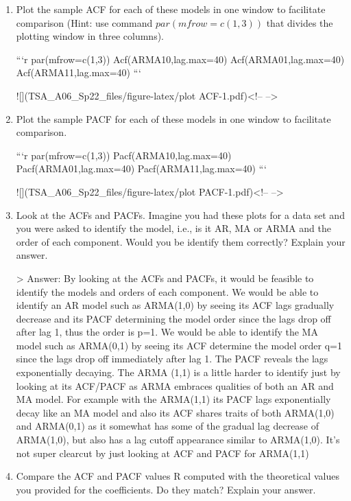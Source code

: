 \documentclass[
]{article}
\begin{document}
\begin{enumerate}[label=(\alph*)]

\item Plot the sample ACF for each of these models in one window to facilitate comparison (Hint: use command $par(mfrow=c(1,3))$ that divides the plotting window in three columns).  


```r
par(mfrow=c(1,3))
Acf(ARMA10,lag.max=40)
Acf(ARMA01,lag.max=40)
Acf(ARMA11,lag.max=40)
```

![](TSA_A06_Sp22_files/figure-latex/plot ACF-1.pdf)<!-- --> 


\item Plot the sample PACF for each of these models in one window to facilitate comparison.  


```r
par(mfrow=c(1,3))
Pacf(ARMA10,lag.max=40)
Pacf(ARMA01,lag.max=40)
Pacf(ARMA11,lag.max=40)
```

![](TSA_A06_Sp22_files/figure-latex/plot PACF-1.pdf)<!-- --> 

\item Look at the ACFs and PACFs. Imagine you had these plots for a data set and you were asked to identify the model, i.e., is it AR, MA or ARMA and the order of each component. Would you be identify them correctly? Explain your answer.

> Answer: By looking at the ACFs and PACFs, it would be feasible to identify the models and orders of each component. We would be able to identify an AR model such as ARMA(1,0) by seeing its ACF lags gradually decrease and its PACF determining the model order since the lags drop off after lag 1, thus the order is p=1. We would be able to identify the MA model such as ARMA(0,1) by seeing its ACF determine the model order q=1 since the lags drop off immediately after lag 1. The PACF reveals the lags exponentially decaying. The ARMA (1,1) is a little harder to identify just by looking at its ACF/PACF as ARMA embraces qualities of both an AR and MA model. For example with the ARMA(1,1) its PACF lags exponentially decay like an MA model and also its ACF shares traits of both ARMA(1,0) and ARMA(0,1) as it somewhat has some of the gradual lag decrease of ARMA(1,0), but also has a lag cutoff appearance similar to ARMA(1,0). It's not super clearcut by just looking at ACF and PACF for ARMA(1,1) 

\item Compare the ACF and PACF values R computed with the theoretical values you provided for the coefficients. Do they match? Explain your answer.


\end{enumerate}
\end{document}
